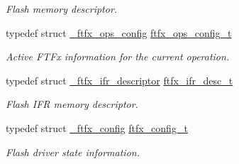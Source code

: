 \begin{DoxyCompactItemize}
\begin{DoxyCompactList}\small\item\em Flash memory descriptor. \end{DoxyCompactList}\item 
\mbox{\label{group__ftfx__controller_ga721d5f2f64785b7580862e942e17737e}} 
typedef struct \mbox{\hyperlink{struct__ftfx__ops__config}{\+\_\+ftfx\+\_\+ops\+\_\+config}} \mbox{\hyperlink{group__ftfx__controller_ga721d5f2f64785b7580862e942e17737e}{ftfx\+\_\+ops\+\_\+config\+\_\+t}}
\begin{DoxyCompactList}\small\item\em Active F\+T\+Fx information for the current operation. \end{DoxyCompactList}\item 
\mbox{\label{group__ftfx__controller_ga25d8176fbbb387ae5e5ba3fa32667d72}} 
typedef struct \mbox{\hyperlink{struct__ftfx__ifr__descriptor}{\+\_\+ftfx\+\_\+ifr\+\_\+descriptor}} \mbox{\hyperlink{group__ftfx__controller_ga25d8176fbbb387ae5e5ba3fa32667d72}{ftfx\+\_\+ifr\+\_\+desc\+\_\+t}}
\begin{DoxyCompactList}\small\item\em Flash I\+FR memory descriptor. \end{DoxyCompactList}\item 
typedef struct \mbox{\hyperlink{struct__ftfx__config}{\+\_\+ftfx\+\_\+config}} \mbox{\hyperlink{group__ftfx__controller_gab0196063c05bffb4cd2f249699a3378c}{ftfx\+\_\+config\+\_\+t}}
\begin{DoxyCompactList}\small\item\em Flash driver state information. \end{DoxyCompactList}\end{DoxyCompactItemize}
